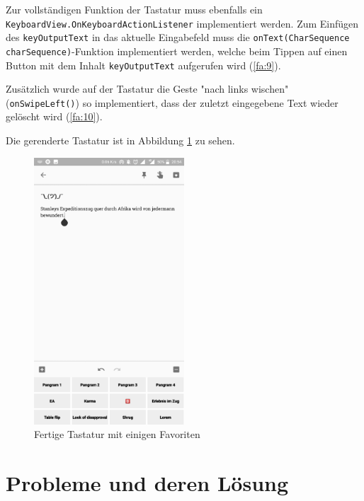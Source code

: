 \documentclass[11pt]{article}
\begin{document}
	\noindent Zur vollständigen Funktion der Tastatur muss ebenfalls ein \texttt{KeyboardView.OnKeyboardActionListener} implementiert werden. Zum Einfügen des \texttt{keyOutputText} in das aktuelle Eingabefeld muss die \texttt{onText(CharSequence charSequence)}-Funktion implementiert werden, welche beim Tippen auf einen Button mit dem Inhalt \texttt{keyOutputText} aufgerufen wird (\ref{fa:9}).\newline
	
	\noindent Zusätzlich wurde auf der Tastatur die Geste "nach links wischen" (\texttt{onSwipeLeft()}) so implementiert, dass der zuletzt eingegebene Text wieder gelöscht wird (\ref{fa:10}).
	
	\noindent Die gerenderte Tastatur ist in Abbildung \ref{fig:keyboard} zu sehen.
	
	\begin{figure}[H]
		\centering
		\includegraphics[width=0.5\textwidth]{Konzepte/screenshots/keyboard.jpg}
		\caption{Fertige Tastatur mit einigen Favoriten}
		\label{fig:keyboard}
	\end{figure}
	
	
	
	\section{Probleme und deren Lösung}
\end{document}
